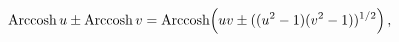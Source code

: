 \[\mathop{\mathrm{Arccosh}\/}\nolimits u\pm\mathop{\mathrm{Arccosh}\/}\nolimits v%
=\mathop{\mathrm{Arccosh}\/}\nolimits\!\left(uv\pm((u^{2}-1)(v^{2}-1))^{1/2}%
\right),\]